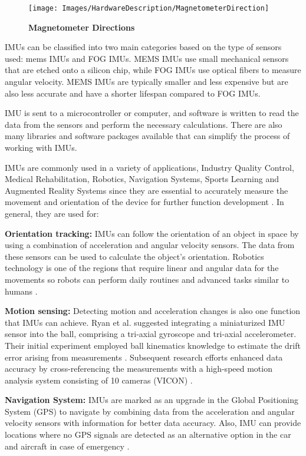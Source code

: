 \begin{figure}[h!]\centering
	\texttt{[image: Images/HardwareDescription/MagnetometerDirection]}
	\caption{\textbf{Magnetometer Directions}}
	\label{fig:Magnetometer}
	\cite{Stm:2015}
\end{figure}

IMUs can be classified into two main categories based on the type of sensors used: \ac{mems} IMUs and \ac{FOG} IMUs. MEMS IMUs use small mechanical sensors that are etched onto a silicon chip, while FOG IMUs use optical fibers to measure angular velocity. MEMS IMUs are typically smaller and less expensive but are also less accurate and have a shorter lifespan compared to FOG IMUs\cite{Deppe:2017}.

IMU is sent to a microcontroller or computer, and software is written to read the data from the sensors and perform the necessary calculations. There are also many libraries and software packages available that can simplify the process of working with IMUs.

IMUs are commonly used in a variety of applications, Industry Quality Control, Medical Rehabilitation, Robotics, Navigation Systems, Sports Learning and Augmented Reality Systems since they are essential to accurately measure the movement and orientation of the device for further function development \cite{Ahmad:2013}. In general, they are used for: 

\textbf{Orientation tracking:} IMUs can follow the orientation of an object in space by using a combination of acceleration and angular velocity sensors. The data from these sensors can be used to calculate the object's orientation. Robotics technology is one of the regions that require linear and angular data for the movements so robots can perform daily routines and advanced tasks similar to humans \cite{Ahmad:2013}.  

\textbf{Motion sensing:}  Detecting motion and acceleration changes is also one function that IMUs can achieve. Ryan et al. suggested integrating a miniaturized IMU sensor into the ball, comprising a tri-axial gyroscope and tri-axial accelerometer. Their initial experiment employed ball kinematics knowledge to estimate the drift error arising from measurements \cite{McGinnis:2011}. Subsequent research efforts enhanced data accuracy by cross-referencing the measurements with a high-speed motion analysis system consisting of 10 cameras (VICON) \cite{McGinnis:2012}.

\textbf{Navigation System:} IMUs are marked as an upgrade in the Global Positioning System (GPS) to navigate by combining data from the acceleration and angular velocity sensors with information for better data accuracy. Also, IMU can provide locations where no GPS signals are detected as an alternative option in the car and aircraft in case of emergency \cite{Ahmad:2013}. 

